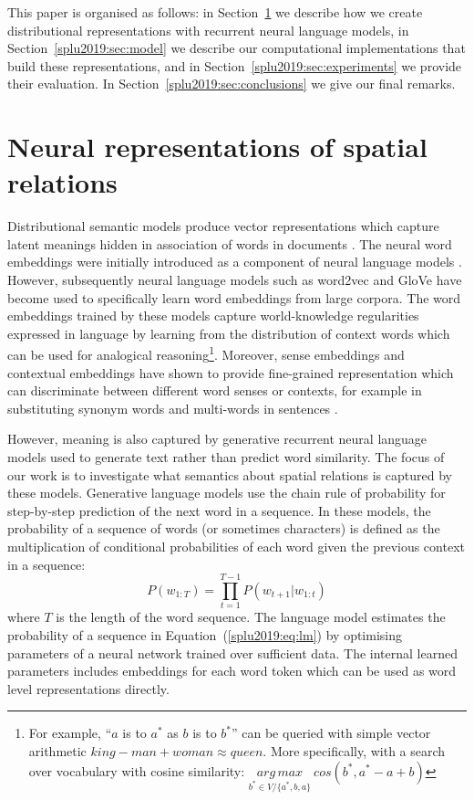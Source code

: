 This paper is organised as follows: in Section~\ref{splu2019:sec:representations} we
describe how we create distributional representations with recurrent neural language models, in Section~\ref{splu2019:sec:model} we describe our computational
implementations that build these representations, and in Section~\ref{splu2019:sec:experiments} we
provide their evaluation. In Section~\ref{splu2019:sec:conclusions} we give our final
remarks.


\section{Neural representations of spatial relations}\label{splu2019:sec:representations}

Distributional semantic models produce vector representations which capture
latent meanings hidden in association of words in documents
\cite{church1990word,turney2010frequency}.
The neural word embeddings
were initially introduced as a component of neural language models
\cite{bengio2003neural}. However, subsequently neural language models such as
word2vec \cite{mikolov2013distributed} and GloVe \cite{pennington2014glove}
have become used to specifically learn word embeddings from large corpora.
The word embeddings trained by these models capture world-knowledge
regularities expressed in language by learning from the distribution of context
words which can be used for analogical reasoning\footnote{For example, ``$a$ is
to $a^*$ as $b$ is to $b^*$'' can be queried with simple vector arithmetic
$king-man+woman \approx queen$. More specifically, with a search over
vocabulary with cosine similarity:
$\underset{b^* \in V /\{a^*,b,a\}}{arg\,max}\ cos(b^*, a^* - a + b)$ }.
Moreover, sense embeddings \cite{neelakantan2014efficient} and contextual
embeddings \cite{peters2018deep} have shown to provide fine-grained
representation which can discriminate between different word senses or
contexts, for example in substituting synonym words and multi-words in
sentences \cite{mccarthy2007semeval}.



However, meaning is also captured by generative recurrent neural language
models used to generate text rather than predict word similarity. The focus of
our work is to investigate what semantics about spatial relations is captured
by these models. Generative language models use the chain rule of probability
for step-by-step prediction of the next word in a sequence. In these models,
the probability of a sequence of words (or sometimes characters) is defined as
the multiplication of conditional probabilities of each word given the previous
context in a sequence:
\begin{equation}\label{splu2019:eq:lm}
  P(w_{1:T}) = \prod_{t=1}^{T-1}{P(w_{t+1}|w_{1:t})}
\end{equation}
\noindent where $T$ is the length of the word sequence.
The language model estimates the probability of a sequence in
Equation~(\ref{splu2019:eq:lm}) by optimising parameters of a neural network trained
over sufficient data. The internal learned parameters includes embeddings for
each word token which can be used as word level representations directly.

